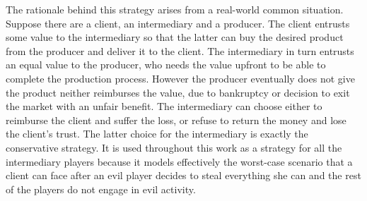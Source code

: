\documentclass[11pt]{llncs}
\theoremstyle{definition}
\begin{document}
     The rationale behind this strategy arises from a real-world common situation. Suppose there are a client, an
     intermediary and a producer. The client entrusts some value to the intermediary so that the latter can buy the desired
     product from the producer and deliver it to the client. The intermediary in turn entrusts an equal value to the
     producer, who needs the value upfront to be able to complete the production process. However the producer eventually
     does not give the product neither reimburses the value, due to bankruptcy or decision to exit the market with an unfair
     benefit. The intermediary can choose either to reimburse the client and suffer the loss, or refuse to return the money
     and lose the client's trust. The latter choice for the intermediary is exactly the conservative strategy. It is used
     throughout this work as a strategy for all the intermediary players because it models effectively the worst-case
     scenario that a client can face after an evil player decides to steal everything she can and the rest of the players do
     not engage in evil activity.
\end{document}
